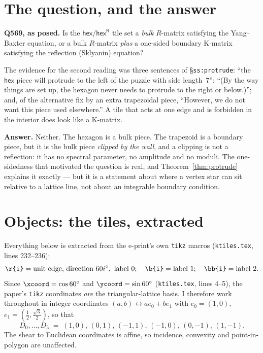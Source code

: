 \documentclass[11pt]{article}
\theoremstyle{definition}
\newcommand{\hex}{\mathsf{hex}}
\newcommand{\hexR}{\mathsf{hex}^{\mathsf{R}}}
\begin{document}
\section{The question, and the answer}

\textbf{Q569, as posed.} Is the $\hex/\hexR$ tile set a \emph{bulk} $R$-matrix
satisfying the Yang--Baxter equation, or a bulk $R$-matrix \emph{plus} a
one-sided boundary K-matrix satisfying the reflection (Sklyanin) equation?

The evidence for the second reading was three sentences of
\S\texttt{ss:protrude}: ``the $\hex$ piece will protrude to the left of the
puzzle with side length~$7$''; ``(By the way things are set up, the hexagon
never needs to protrude to the right or below.)''; and, of the alternative fix
by an extra trapezoidal piece, ``However, we do not want this piece used
elsewhere.'' A tile that acts at one edge and is forbidden in the interior does
look like a K-matrix.

\textbf{Answer.} Neither. The hexagon is a bulk piece. The trapezoid is a
boundary piece, but it is the bulk piece \emph{clipped by the wall}, and a
clipping is not a reflection: it has no spectral parameter, no amplitude and no
moduli. The one-sidedness that motivated the question is real, and
Theorem~\ref{thm:protrude} explains it exactly --- but it is a statement about
where a vertex star can sit relative to a lattice line, not about an
integrable boundary condition.

\section{Objects: the tiles, extracted}\label{sec:objects}

Everything below is extracted from the e-print's own \texttt{tikz} macros
(\texttt{ktiles.tex}, lines 232--236):
\[
  \verb|\r{i}| = \text{unit edge, direction } 60i^\circ,\ \text{label } 0;\quad
  \verb|\b{i}| = \text{label } 1;\quad
  \verb|\bb{i}| = \text{label } 2 .
\]
Since $\verb|\xcoord|=\cos 60^\circ$ and $\verb|\ycoord|=\sin 60^\circ$
(\texttt{ktiles.tex}, lines 4--5), the paper's \texttt{tikz} coordinates
\emph{are} the triangular-lattice basis. I therefore work throughout in integer
coordinates $(a,b) \leftrightarrow a e_0 + b e_1$ with
$e_0=(1,0)$, $e_1=(\tfrac12,\tfrac{\sqrt3}{2})$, so that
\[
 D_0,\dots,D_5 \;=\; (1,0),\,(0,1),\,(-1,1),\,(-1,0),\,(0,-1),\,(1,-1) .
\]
The shear to Euclidean coordinates is affine, so incidence, convexity and
point-in-polygon are unaffected.
\end{document}
